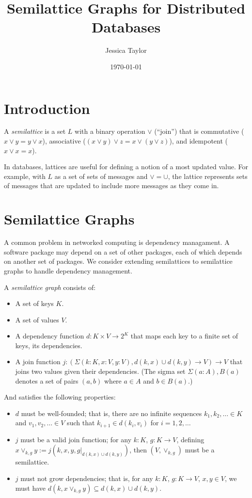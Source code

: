 \documentclass{article}
\title{Semilattice Graphs for Distributed Databases}
\author{Jessica Taylor}
\date{\today}
\begin{document}
    \maketitle
    
    \section{Introduction}
        A \emph{semilattice} is a set $L$ with a binary operation $\vee$ (``join'') that is commutative ($x \vee y = y \vee x$), associative ($(x \vee y) \vee z = x \vee (y \vee z)$), and idempotent ($x \vee x = x$).

        In databases, lattices are useful for defining a notion of a most updated value. For example, with $L$ as a set of sets of messages and $\vee = \cup$, the lattice represents sets of messages that are updated to include more messages as they come in.


    \section{Semilattice Graphs}

        A common problem in networked computing is dependency managament. A software package may depend on a set of other packages, each of which depends on another set of packages. We consider extending semilattices to semilattice graphs to handle dependency management.
        
        A \emph{semilattice graph} consists of:

        \begin{itemize}
            \item A set of keys $K$.
            \item A set of values $V$.
            \item A dependency function $d : K \times V \rightarrow 2^K$ that maps each key to a finite set of keys, its dependencies.
            \item A join function $j : (\Sigma (k: K, x : V, y : V), d(k, x) \cup d(k, y) \rightarrow V) \rightarrow V$ that joins two values given their dependencies. (The sigma set $\Sigma (a: A), B(a)$ denotes a set of pairs $(a, b)$ where $a \in A$ and $b \in B(a)$.)
        \end{itemize}

        And satisfies the following properties:

        \begin{itemize}
            \item $d$ must be well-founded; that is, there are no infinite sequences $k_1, k_2, \ldots \in K$ and $v_1, v_2, \ldots \in V$ such that $k_{i+1} \in d(k_i, v_i)$ for $i = 1, 2, \ldots$
            \item $j$ must be a valid join function; for any $k : K$, $g: K \rightarrow V$, defining $x \vee_{k,g} y := j(k, x, y, g|_{d(k, x) \cup d(k, y)})$, then $(V, \vee_{k,g})$ must be a semilattice.
            \item $j$ must not grow dependencies; that is, for any $k : K$, $g: K \rightarrow V$, $x, y \in V$, we must have $d(k, x \vee_{k, g} y) \subseteq d(k, x) \cup d(k, y)$.
        \end{itemize}
\end{document}
